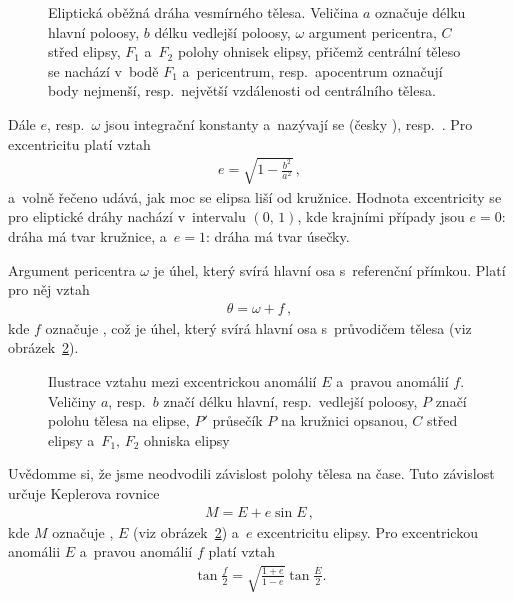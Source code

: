 \documentclass[A4paper, 12pt, oneside]{book}
\begin{document}
\begin{figure}
	\centering
	\caption{Eliptická oběžná dráha vesmírného tělesa. Veličina $a$ označuje délku hlavní poloosy, $b$ délku vedlejší poloosy, $\omega$ argument pericentra, $C$ střed elipsy, $F_1$ a~$F_2$ polohy ohnisek elipsy, přičemž centrální těleso se nachází v~bodě $F_1$ a~pericentrum, resp.\ apocentrum označují body nejmenší, resp.\ největší vzdálenosti od centrálního tělesa.} \label{fig:elip}
\end{figure}

Dále $e$, resp.\ $\omega$ jsou integrační konstanty a~nazývají se  (česky ), resp.\ . Pro excentricitu platí vztah
\begin{align}
	e=\sqrt{1-\frac{b^2}{a^2}}\,,
\end{align}
a~volně řečeno udává, jak moc se elipsa liší od kružnice. Hodnota excentricity se pro eliptické dráhy nachází v~intervalu $(0,\,1)$, kde krajními případy jsou $e=0$: dráha má tvar kružnice, a~$e=1$: dráha má tvar úsečky.

Argument pericentra $\omega$ je úhel, který svírá hlavní osa s~referenční přímkou. Platí pro něj vztah
\begin{align}
	\theta=\omega+f\,,
\end{align}
kde $f$ označuje , což je úhel, který svírá hlavní osa s~průvodičem tělesa (viz obrázek~\ref{fig:E}).

\begin{figure}[!htb] 
	\centering
	\caption{Ilustrace vztahu mezi excentrickou anomálií $E$ a~pravou anomálií $f$. Veličiny $a$, resp.\ $b$ značí délku hlavní, resp.\ vedlejší poloosy, $P$ značí polohu tělesa na elipse, $P'$ průsečík $P$ na kružnici opsanou, $C$ střed elipsy a~$F_1,\,F_2$ ohniska elipsy} \label{fig:E}
\end{figure}

Uvědomme si, že jsme neodvodili závislost polohy tělesa na čase. Tuto závislost určuje Keplerova rovnice
\begin{align} \label{eq:kepler}
M = E + e\sin E\,,
\end{align}
kde $M$ označuje , $E$  (viz obrázek~\ref{fig:E}) a~$e$ excentricitu elipsy. Pro excentrickou anomálii $E$ a~pravou anomálií $f$ platí vztah
\begin{align} \label {eq:fE}
	\tan \frac{f}{2} = \sqrt{\frac{1+e}{1-e}}\tan \frac{E}{2}.
\end{align}
\end{document}
